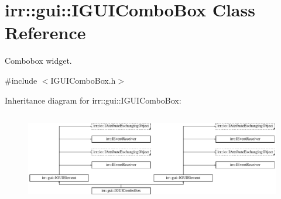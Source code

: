 \hypertarget{classirr_1_1gui_1_1IGUIComboBox}{}\section{irr\+:\+:gui\+:\+:I\+G\+U\+I\+Combo\+Box Class Reference}
\label{classirr_1_1gui_1_1IGUIComboBox}


Combobox widget.  




{\ttfamily \#include $<$I\+G\+U\+I\+Combo\+Box.\+h$>$}

Inheritance diagram for irr\+:\+:gui\+:\+:I\+G\+U\+I\+Combo\+Box\+:\begin{figure}[H]
\begin{center}
\leavevmode
\includegraphics[height=4.038462cm]{classirr_1_1gui_1_1IGUIComboBox}
\end{center}
\end{figure}
